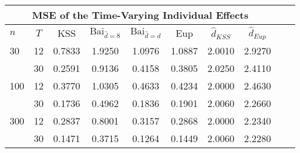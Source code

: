 \begin{tabular}{lccccccccc} 
\hline \multicolumn{8}{c}{MSE of the Time-Varying Individual Effects} \\ \hline 
$n$ & $T$ & KSS & $ \text{Bai}_{\hat{d} = 8}$ & $\text{Bai}_{\hat{d} = d}$ & Eup & $\hat{d}_{KSS}$ & $\hat{d}_{Eup}$ \\
\hline
30 & 12 &  0.7833  &  1.9250  &  1.0976  &  1.0887  &  2.0010  &  2.9270  \\
& 30 &  0.2591  &  0.9136  &  0.4158  &  0.3805  &  2.0250  &  2.4110  \\
100 & 12 &  0.3770  &  1.0305  &  0.4633  &  0.4234  &  2.0000  &  2.4630  \\
& 30 &  0.1736  &  0.4962  &  0.1836  &  0.1901  &  2.0060  &  2.2660  \\
300 & 12 &  0.2837  &  0.8001  &  0.3157  &  0.2868  &  2.0000  &  2.2340  \\
& 30 &  0.1471  &  0.3715  &  0.1264  &  0.1449  &  2.0060  &  2.2280  \\
\end{tabular} 
